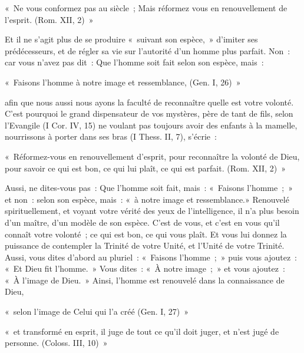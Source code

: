 \documentclass[french,twoside]{book} %
\newenvironment{quoteblock}%
  {\begin{quoting}}
  {\end{quoting}}
\newenvironment{quotebar}{%
    \def\FrameCommand{{\color{rubric!10!}\vrule width 0.5em} \hspace{0.9em}}%
    \def\OuterFrameSep{\itemsep} %
    \MakeFramed {\advance\hsize-\width \FrameRestore}
  }%
  {%
    \endMakeFramed
  }
\renewenvironment{quoteblock}%
  {%
    \savenotes
    \setstretch{0.9}
    \normalfont
    \begin{quotebar}
  }
  {%
    \end{quotebar}
    \spewnotes
  }
\begin{document}
\begin{quoteblock}
\noindent « Ne vous conformez pas au siècle ; Mais réformez vous en renouvellement de l’esprit. (Rom. XII, 2) »\end{quoteblock}

\noindent Et il ne s’agit plus de se produire « suivant son espèce, » d’imiter ses prédécesseurs, et de régler sa vie sur l’autorité d’un homme plus parfait. Non : car vous n’avez pas dit : Que l’homme soit fait selon son espèce, mais :\par

\begin{quoteblock}
\noindent « Faisons l’homme à notre image et ressemblance, (Gen. I, 26) »\end{quoteblock}

\noindent afin que nous aussi nous ayons la faculté de reconnaître quelle est votre volonté. C’est pourquoi le grand dispensateur de vos mystères, père de tant de fils, selon l’Evangile (I Cor. IV, 15) ne voulant pas toujours avoir des enfants à la mamelle, nourrissons à porter dans ses bras (I Thess. II, 7), s’écrie :\par

\begin{quoteblock}
\noindent « Réformez-vous en renouvellement d’esprit, pour reconnaître la volonté de Dieu, pour savoir ce qui est bon, ce qui lui plaît, ce qui est parfait. (Rom. XII, 2) »\end{quoteblock}

\noindent Aussi, ne dites-vous pas : Que l’homme soit fait, mais : « Faisons l’homme ; » et non : selon son espèce, mais : « à notre image et ressemblance.» Renouvelé spirituellement, et voyant votre vérité des yeux de l’intelligence, il n’a plus besoin d’un maître, d’un modèle de son espèce. C’est de vous, et c’est en vous qu’il connaît votre volonté ; ce qui est bon, ce qui vous plaît. Et vous lui donnez la puissance de contempler la Trinité de votre Unité, et l’Unité de votre Trinité. Aussi, vous dites d’abord au pluriel : « Faisons l’homme ; » puis vous ajoutez : « Et Dieu fit l’homme. » Vous dites : « À notre image ; » et vous ajoutez : « À l’image de Dieu. » Ainsi, l’homme est renouvelé dans la connaissance de Dieu,\par

\begin{quoteblock}
\noindent « selon l’image de Celui qui l’a créé (Gen. I, 27) »\end{quoteblock}


\begin{quoteblock}
\noindent « et transformé en esprit, il juge de tout ce qu’il doit juger, et n’est jugé de personne. (Coloss. III, 10) »\end{quoteblock}
\end{document}
